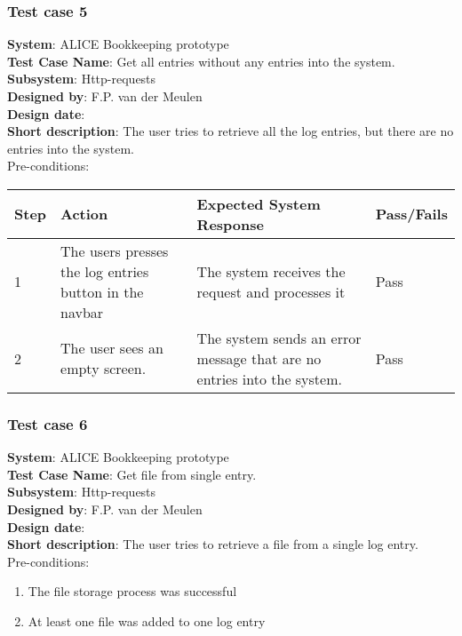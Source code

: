 \subsubsection{Test case 5}
\textbf{System}:  ALICE Bookkeeping prototype \\
\textbf{Test Case Name}:  Get all entries without any entries into the system. \\
\textbf{Subsystem}:  Http-requests \\
\textbf{Designed by}:  F.P. van der Meulen\\
\textbf{Design date}:  \\
\textbf{Short description}: The user tries to retrieve all the log entries, but there are no entries into the system. \\

Pre-conditions: \\

\begin{longtable}{ | p{0.8cm} | p{4.5cm} | p{6cm} | p{1.5cm} |}
\hline
Step & Action & Expected System Response & Pass/Fails  \\ \hline
1 & The users presses the log entries button in the navbar & The system receives the request and processes it & Pass \\ \hline
2 & The user sees an empty screen. & The system sends an error message that are no entries into the system. & Pass \\ \hline

\end{longtable}
\subsubsection{Test case 6}
\textbf{System}:  ALICE Bookkeeping prototype \\
\textbf{Test Case Name}:  Get file from single entry. \\
\textbf{Subsystem}:  Http-requests \\
\textbf{Designed by}:  F.P. van der Meulen\\
\textbf{Design date}:  \\
\textbf{Short description}: The user tries to retrieve a file from a single log entry. \\

Pre-conditions: \\
\begin{enumerate}
\item The file storage process was successful
\item At least one file was added to one log entry
\end{enumerate}

